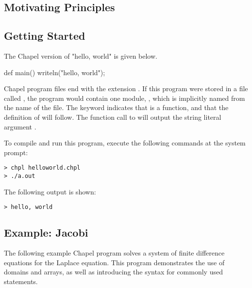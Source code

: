 \label{Language_Overview}

\subsection{Motivating Principles}

\subsection{Getting Started}

The Chapel version of "hello, world" is given below.
\begin{chapel}
def main() {
  writeln("hello, world");
}
\end{chapel}
Chapel program files end with the extension .  
If this program were stored in a file called ,
the program would contain one module, , which is implicitly
named from the name of the file.  The keyword  indicates that 
 is a function, and that the definition of  will 
follow.  The function call to  will output the string
literal argument .

To compile and run this program, execute the following
commands at the system prompt:
\begin{verbatim} 
> chpl helloworld.chpl
> ./a.out
\end{verbatim}
The following output is shown:
\begin{verbatim}
> hello, world
\end{verbatim}

\subsection{Example: Jacobi}
The following example Chapel program solves a system of finite difference
equations for the Laplace equation.  This program demonstrates the use
of domains and arrays, as well as introducing the syntax for commonly used
statements.

